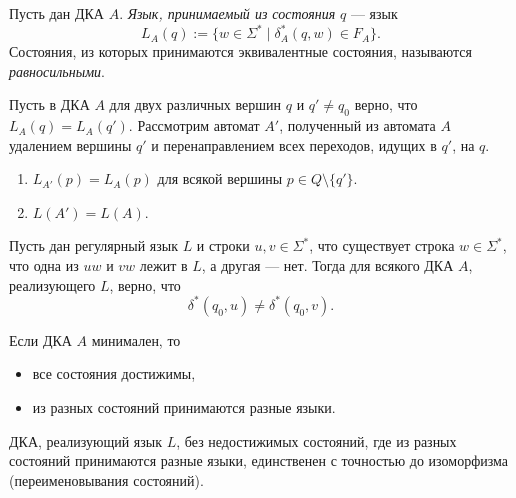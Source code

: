 \documentclass[12pt,a4paper]{article}
\begin{document}
    \begin{definition}
        Пусть дан ДКА $A$. \emph{Язык, принимаемый из состояния} $q$ --- язык
        \[L_A(q) := \{w \in \Sigma^* \mid \delta_A^*(q, w) \in F_A\}.\]
        Состояния, из которых принимаются эквивалентные состояния, называются \emph{равносильными}.
    \end{definition}

    \begin{lemma}
        Пусть в ДКА $A$ для двух различных вершин $q$ и $q' \neq q_0$ верно, что $L_A(q) = L_A(q')$. Рассмотрим автомат $A'$, полученный из автомата $A$ удалением вершины $q'$ и перенаправлением всех переходов, идущих в $q'$, на $q$.
        \begin{enumerate}
            \item $L_{A'}(p) = L_A(p)$ для всякой вершины $p \in Q \setminus \{q'\}$.
            \item $L(A') = L(A)$.
        \end{enumerate}
    \end{lemma}

    \begin{lemma}
        Пусть дан регулярный язык $L$ и строки $u, v \in \Sigma^*$, что существует строка $w \in \Sigma^*$, что одна из $uw$ и $vw$ лежит в $L$, а другая --- нет. Тогда для всякого ДКА $A$, реализующего $L$, верно, что
        \[\delta^*(q_0, u) \neq \delta^*(q_0, v).\]
    \end{lemma}

    \begin{lemma}
        Если ДКА $A$ минимален, то
        \begin{itemize}
            \item все состояния достижимы,
            \item из разных состояний принимаются разные языки.
        \end{itemize}
    \end{lemma}

    \begin{theorem}
        ДКА, реализующий язык $L$, без недостижимых состояний, где из разных состояний принимаются разные языки, единственен с точностью до изоморфизма (переименовывания состояний).
    \end{theorem}
\end{document}

